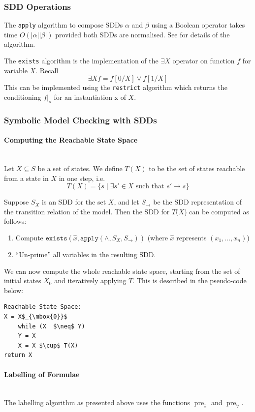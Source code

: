 \documentclass{article}
\newcommand{\pre}{\mathop{\mathrm{pre}}}
\newcommand{\myparagraph}[1]{\paragraph{#1}\mbox{}\\}
\begin{document}
\subsubsection{SDD Operations}

The \texttt{apply} algorithm to compose SDDs $\alpha$ and $\beta$ using a Boolean operator takes time $O(|\alpha||\beta|)$ provided both SDDs 
are normalised. See \cite{sdd_1} for details of the algorithm.

The \texttt{exists} algorithm is the implementation of the $\exists X$ operator on function $f$ for variable $X$. Recall $$\exists X f = f[0/X] \lor f[1/X]$$
This can be implemented using the \texttt{restrict} algorithm which returns the conditioning $f|_{\mbox{x}}$ for an instantiation x of $X$.  
 
\subsubsection{Symbolic Model Checking with SDDs}

\myparagraph{Computing the Reachable State Space}

Let $X \subseteq S$ be a set of states. We define $T(X)$ to be the set of states reachable from a state in $X$ in one step, i.e. $$T(X) = \{ s \mid \exists s' \in X\mbox{ such that }s' \rightarrow s \}$$

Suppose $S_X$ is an SDD for the set $X$, and let $S_{\rightarrow}$ be the SDD representation of the transition relation of the model. 
Then the SDD for $T(X$) can be computed as follows: 
\begin{enumerate} 
\item Compute $\texttt{exists}(\hat{x}, \texttt{apply}(\land, S_X, S_{\rightarrow}) )$ (where $\hat{x}$ represents $(x_1, ..., x_n )$)
\item ``Un-prime'' all variables in the resulting SDD.
\end{enumerate}

We can now compute the whole reachable state space, starting from the set of initial states $X_0$ and iteratively applying $T$. This is described in the pseudo-code below:

\begin{lstlisting}[mathescape]
Reachable State Space:
X = X$_{\mbox{0}}$
	while (X  $\neq$ Y) 
	Y = X
	X = X $\cup$ T(X)
return X
\end{lstlisting}

\myparagraph{Labelling of Formulae}

The labelling algorithm as presented above uses the functions 
$\pre_{\exists}$ and $\pre_{\forall}$. 
\end{document}
